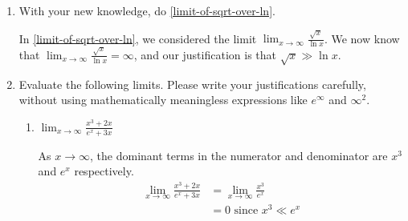 \documentclass{article}
\begin{document}
\begin{enumerate}[resume]
\item 


  \begin{problem}
    With your new knowledge, do \ref{limit-of-sqrt-over-ln}. 
  \end{problem}

  \begin{solution}
    In \ref{limit-of-sqrt-over-ln}, we considered the limit 
    $\displaystyle \lim_{x \to \infty} \frac{\sqrt{x}}{\ln x}$. We now
    know that $\displaystyle \lim_{x \to \infty} \frac{\sqrt{x}}{\ln x} = \infty$, and our justification is that $\sqrt{x} \gg \ln x$. 
  \end{solution}

\item  Evaluate the following limits. Please write your justifications carefully, without using mathematically meaningless expressions like $e^\infty$ and $\infty^2$.

  \begin{enumerate}

  \item


    \begin{problem}[\vfill]
      $\displaystyle \lim_{x \to \infty} \frac{x^3 + 2x}{e^x + 3x}$      
    \end{problem}

    \begin{solution}
      As $x\to \infty$, the dominant terms in the numerator and denominator
      are $x^3$ and $e^x$ respectively.
      \begin{align*}
        \lim_{x \to \infty} \frac{x^3 + 2x}{e^x + 3x} &= \lim_{x \to \infty} \frac{x^3}{e^x} \\
        &= 0 \text{ since $x^3 \ll e^x$}
      \end{align*}
    \end{solution}


\end{enumerate}
\end{enumerate}
\end{document}
